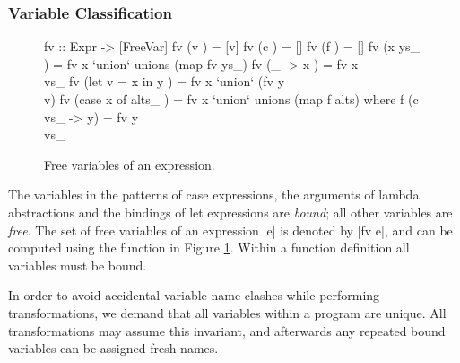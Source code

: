 \subsubsection{Variable Classification}

\begin{figure}
\begin{code}
fv :: Expr -> [FreeVar]
fv (v                ) = [v]
fv (c                ) = []
fv (f                ) = []
fv (x ys_            ) = fv x `union` unions (map fv ys_)
fv (\vs_ -> x        ) = fv x \\ vs_
fv (let v = x in y   ) = fv x `union` (fv y \\ v)
fv (case x of alts_  ) = fv x `union` unions (map f alts)
    where f (c vs_ -> y) = fv y \\ vs_
\end{code}
\caption{Free variables of an expression.}
\label{fig:free_variables}
\end{figure}

The variables in the patterns of case expressions, the arguments of lambda abstractions and the bindings of let expressions are \textit{bound}; all other variables are \textit{free}. The set of free variables of an expression |e| is denoted by |fv e|, and can be computed using the function in Figure \ref{fig:free_variables}. Within a function definition all variables must be bound.

In order to avoid accidental variable name clashes while performing transformations, we demand that all variables within a program are unique. All transformations may assume this invariant, and afterwards any repeated bound variables can be assigned fresh names.

